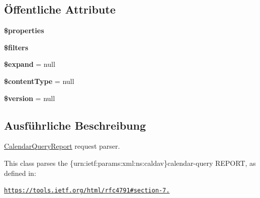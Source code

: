 \subsection*{Öffentliche Attribute}
\begin{DoxyCompactItemize}
\item 
\mbox{\label{class_sabre_1_1_cal_d_a_v_1_1_xml_1_1_request_1_1_calendar_query_report_accf8d93d57c5413f3bc91617c22546c5}} 
{\bfseries \$properties}
\item 
\mbox{\label{class_sabre_1_1_cal_d_a_v_1_1_xml_1_1_request_1_1_calendar_query_report_a55440c4c25cd8192b03ea583035906d2}} 
{\bfseries \$filters}
\item 
\mbox{\label{class_sabre_1_1_cal_d_a_v_1_1_xml_1_1_request_1_1_calendar_query_report_a6322387cffee0dadd32e97652d31374e}} 
{\bfseries \$expand} = null
\item 
\mbox{\label{class_sabre_1_1_cal_d_a_v_1_1_xml_1_1_request_1_1_calendar_query_report_a1d9e7c05a7d8fef6948074906abd75b8}} 
{\bfseries \$content\+Type} = null
\item 
\mbox{\label{class_sabre_1_1_cal_d_a_v_1_1_xml_1_1_request_1_1_calendar_query_report_a57801486d567e96da320ee846f8986c9}} 
{\bfseries \$version} = null
\end{DoxyCompactItemize}


\subsection{Ausführliche Beschreibung}
\mbox{\hyperlink{class_sabre_1_1_cal_d_a_v_1_1_xml_1_1_request_1_1_calendar_query_report}{Calendar\+Query\+Report}} request parser.

This class parses the \{urn\+:ietf\+:params\+:xml\+:ns\+:caldav\}calendar-\/query R\+E\+P\+O\+RT, as defined in\+:

\href{https://tools.ietf.org/html/rfc4791#section-7.9}{\tt https\+://tools.\+ietf.\+org/html/rfc4791\#section-\/7.}


